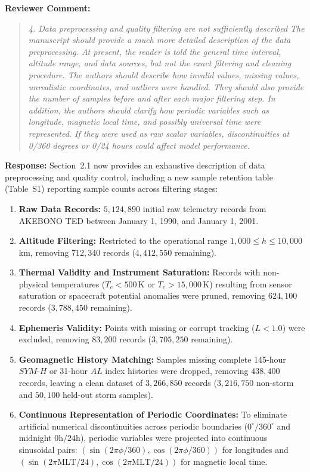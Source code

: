 \documentclass[a4paper,12pt]{article}
\newcommand{\reviewercomment}[1]{%
  \begin{samepage}%
  \par\noindent\textbf{Reviewer Comment:}\par
  \begin{quote}\itshape #1\end{quote}}
\newcommand{\filledresponse}[1]{%
  \par\noindent\textbf{Response:} #1\par
  \vspace{0.4cm}%
  \end{samepage}}
\begin{document}
\reviewercomment{4. Data preprocessing and quality filtering are not sufficiently described The manuscript should
provide a much more detailed description of the data preprocessing. At present, the reader is told
the general time interval, altitude range, and data sources, but not the exact filtering and
cleaning procedure. The authors should describe how invalid values, missing values, unrealistic
coordinates, and outliers were handled. They should also provide the number of samples before and
after each major filtering step. In addition, the authors should clarify how periodic variables such
as longitude, magnetic local time, and possibly universal time were represented. If they were used
as raw scalar variables, discontinuities at 0/360 degrees or 0/24 hours could affect model
performance.}
\filledresponse{Section~2.1 now provides an exhaustive description of data preprocessing and quality control, including a new sample retention table (Table~S1) reporting sample counts across filtering stages:
\begin{enumerate}
    \item \textbf{Raw Data Records:} $5{,}124{,}890$ initial raw telemetry records from AKEBONO TED between January 1, 1990, and January 1, 2001.
    \item \textbf{Altitude Filtering:} Restricted to the operational range $1{,}000 \le h \le 10{,}000$\,km, removing $712{,}340$ records ($4{,}412{,}550$ remaining).
    \item \textbf{Thermal Validity and Instrument Saturation:} Records with non-physical temperatures ($T_e < 500$\,K or $T_e > 15{,}000$\,K) resulting from sensor saturation or spacecraft potential anomalies were pruned, removing $624{,}100$ records ($3{,}788{,}450$ remaining).
    \item \textbf{Ephemeris Validity:} Points with missing or corrupt tracking ($L < 1.0$) were excluded, removing $83{,}200$ records ($3{,}705{,}250$ remaining).
    \item \textbf{Geomagnetic History Matching:} Samples missing complete 145-hour $SYM\text{-}H$ or 31-hour $AL$ index histories were dropped, removing $438{,}400$ records, leaving a clean dataset of $3{,}266{,}850$ records ($3{,}216{,}750$ non-storm and $50{,}100$ held-out storm samples).
    \item \textbf{Continuous Representation of Periodic Coordinates:} To eliminate artificial numerical discontinuities across periodic boundaries ($0^\circ / 360^\circ$ and midnight $0\text{h} / 24\text{h}$), periodic variables were projected into continuous sinusoidal pairs: $(\sin(2\pi \phi / 360), \cos(2\pi \phi / 360))$ for longitudes and $(\sin(2\pi \text{MLT} / 24), \cos(2\pi \text{MLT} / 24))$ for magnetic local time.
\end{enumerate}}
\end{document}
